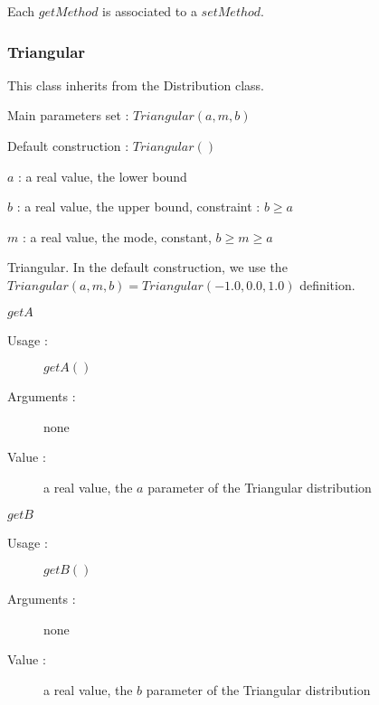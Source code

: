 Each  $getMethod$  is associated to a $setMethod$.




\newpage \subsubsection{Triangular}

This class inherits from the Distribution class.

\begin{description}

\item[Usage :] \rule{0pt}{1em}
  \begin{description}
  \item Main parameters set : $Triangular(a,m,b)$
  \item Default construction : $Triangular( )$
  \end{description}

\item[Arguments :]  \rule{0pt}{1em}
  \begin{description}
  \item $a$ : a  real value, the lower bound
  \item $b$ : a real value, the upper bound, constraint : $b\geq a$
  \item $m$ : a real value, the mode, constant, $b\geq m \geq a$
  \end{description}

\item[Value :] Triangular. In the default construction, we use the $Triangular(a, m, b) = Triangular(-1.0, 0.0, 1.0)$ definition.

\item[Some methods :] \rule{0pt}{1em}
  \begin{description}

  \item $getA$
    \begin{description}
    \item[Usage :] $getA()$
    \item[Arguments :] none
    \item[Value :]  a real value,  the $a$ parameter of the Triangular distribution
    \end{description}
    \bigskip

  \item $getB$
    \begin{description}
    \item[Usage :] $getB()$
    \item[Arguments :] none
    \item[Value :]  a real value,  the $b$ parameter of the Triangular distribution
    \end{description}
    \bigskip


\end{description}
\end{description}
